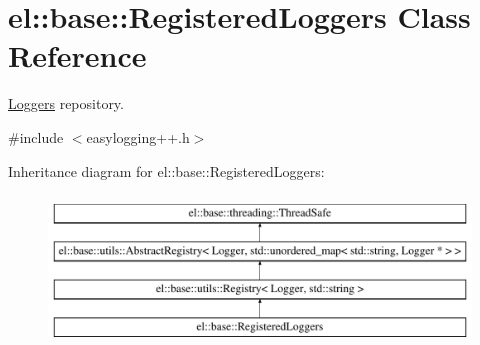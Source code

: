 \hypertarget{classel_1_1base_1_1RegisteredLoggers}{\section{el\-:\-:base\-:\-:Registered\-Loggers Class Reference}
\label{classel_1_1base_1_1RegisteredLoggers}
}


\hyperlink{classel_1_1Loggers}{Loggers} repository.  




{\ttfamily \#include $<$easylogging++.\-h$>$}

Inheritance diagram for el\-:\-:base\-:\-:Registered\-Loggers\-:\begin{figure}[H]
\begin{center}
\leavevmode
\includegraphics[height=4.000000cm]{classel_1_1base_1_1RegisteredLoggers}
\end{center}
\end{figure}
